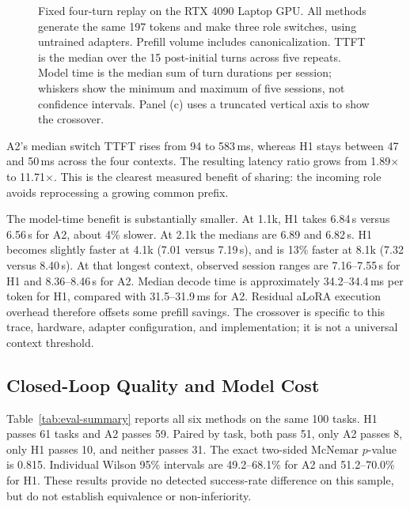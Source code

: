 \documentclass[10pt,twocolumn,letterpaper]{article}
\begin{document}
\begin{figure}[t]
\centering

\caption{Fixed four-turn replay on the RTX 4090 Laptop GPU. All methods
generate the same 197 tokens and make three role switches, using untrained
adapters. Prefill volume includes canonicalization. TTFT is the median over
the 15 post-initial turns across five repeats. Model time is the median sum
of turn durations per session; whiskers show the minimum and maximum of
five sessions, not confidence intervals. Panel (c) uses a truncated vertical
axis to show the crossover.}
\label{fig:cost-scaling}
\end{figure}

A2's median switch TTFT rises from 94 to 583\,ms, whereas H1 stays between
47 and 50\,ms across the four contexts. The resulting latency ratio grows
from 1.89$\times$ to 11.71$\times$. This is the clearest measured benefit
of sharing: the incoming role avoids reprocessing a growing common prefix.

The model-time benefit is substantially smaller. At 1.1k, H1 takes 6.84\,s
versus 6.56\,s for A2, about 4\% slower. At 2.1k the medians are 6.89 and
6.82\,s. H1 becomes slightly faster at 4.1k (7.01 versus 7.19\,s), and is
13\% faster at 8.1k (7.32 versus 8.40\,s). At that longest context, observed
session ranges are 7.16--7.55\,s for H1 and 8.36--8.46\,s for A2. Median
decode time is approximately 34.2--34.4\,ms per token for H1, compared with
31.5--31.9\,ms for A2. Residual aLoRA execution overhead therefore offsets
some prefill savings. The crossover is specific to this trace, hardware,
adapter configuration, and implementation; it is not a universal context
threshold.

\subsection{Closed-Loop Quality and Model Cost}
Table~\ref{tab:eval-summary} reports all six methods on the same 100 tasks.
H1 passes 61 tasks and A2 passes 59. Paired by task, both pass 51, only A2
passes 8, only H1 passes 10, and neither passes 31. The exact two-sided
McNemar $p$-value is 0.815. Individual Wilson 95\% intervals are
49.2--68.1\% for A2 and 51.2--70.0\% for H1. These results provide no
detected success-rate difference on this sample, but do not establish
equivalence or non-inferiority.

\begin{table}[t]
\centering
\small
\setlength{\tabcolsep}{4pt}

\caption{Closed-loop results on 100 paired MBPP tasks per method, all on
the 4090 with test-suite feedback. Pass counts score the final code after
up to two revisions. Prefill, canonicalization, model time, turns, and
generated tokens are means per task; canonicalization is included in
prefill. TTFT is the pooled median over turns after turn zero. Model time
excludes tools, final scoring, and loading. Generated tokens include stop
tokens.}
\label{tab:eval-summary}
\end{table}
\end{document}
